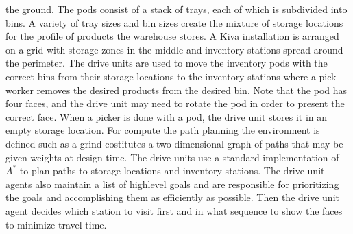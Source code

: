 the ground. The pods consist of a stack of trays,
each of which is subdivided into bins. A variety of
tray sizes and bin sizes create the mixture of storage locations for the profile
of products the warehouse stores.
A Kiva installation is arranged on a
grid with storage zones in the middle and inventory stations spread around the perimeter.
The drive units are used to move the inventory pods with the correct bins
from their storage locations to the inventory stations where a pick worker removes 
the desired products from the desired bin. Note that the pod
has four faces, and the drive unit may need to rotate the pod in order to present
the correct face.
When a picker is done with a pod, the drive unit
stores it in an empty storage location.
For compute the path planning the environment is defined such as a grind costitutes 
a two-dimensional graph of paths that may be given weights at design time. 
The drive units use a standard implementation of $A^*$ to plan paths to storage locations 
and inventory stations. The drive unit agents also maintain a list of highlevel 
goals and are responsible for prioritizing the goals and accomplishing them as efficiently
as possible. Then the drive unit agent decides which station to visit first and in 
what sequence to show the faces to minimize travel time. 


